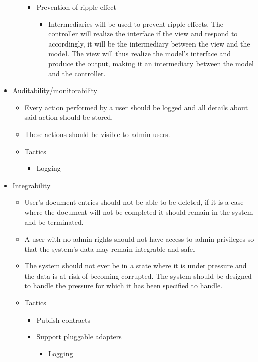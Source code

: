\documentclass[a4paper,12pt]{article}
\begin{document}
\begin{itemize}
\begin{itemize}
\begin{itemize}
				\item Prevention of ripple effect 
				
					\begin{itemize}
						\item Intermediaries will be used to prevent ripple effects. The controller will realize the interface if the view and respond to accordingly, it will be the intermediary between the view and the model. The view will thus realize the model's interface and produce the output, making it an intermediary between the model and the controller.
					\end{itemize}

			\end{itemize}			
			
		\end{itemize}
		\item Auditability/monitorability
		\begin{itemize}
			\item Every action performed by a user should be logged and all details about said action should be stored.
			\item These actions should be visible to admin users.
			
			\item Tactics
			\begin{itemize}
				\item Logging
			\end{itemize}			
			
		\end{itemize}
		\item Integrability
		\begin{itemize}
			\item User's document entries should not be able to be deleted, if it is a case where the document will not be completed it should remain in the system and be terminated.
			\item A user with no admin rights should not have access to admin privileges so that the system's data may remain integrable and safe.
			\item The system should not ever be in a state where it is under pressure and the data is at risk of becoming corrupted. The system should be designed to handle the pressure for which it has been specified to handle.
			
			\item Tactics
			\begin{itemize}
				\item Publish contracts
				\item Support pluggable adapters
					\begin{itemize}
						\item Logging
					\end{itemize}
			\end{itemize}			
		

\end{itemize}
\end{itemize}
\end{document}
